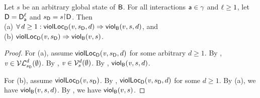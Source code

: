 \begin{proposition}
\label{prop:locScViol-implies-scViol}
\label{prop:lviol-implies-viol}
Let $s$ be an arbitrary global state of $\B$.
For all interactions $\act \in \gamma$ and $\l \ge 1$, let $\DS = \dsks{\act}{\l}$ and $\sD = s \pj \dsk{\act}{\l}$.
Then\\
\ind (a) $\fa d \ge 1:  \scVLd{\ndv}{d}{\sD}{\act}{\l} \imp \scVd{v}{d}{s} $, and\\
\ind (b) $\scVL{\ndv}{\sD}{\act}{\l} \imp \scV{v}{s}$.
\end{proposition}
%
\begin{proof}
For (a), assume $\scVLd{\ndv}{d}{\sD}{\act}{\l}$ for some arbitrary $d \ge 1$.
By ,  $\ndv \in \lVFsi{\sD}{\ewfg}{d}$.
By ,  $\ndv  \in \VFsi{s}{\ewfg}{d}$.
By , $\scVd{\ndv}{d}{s}$.

For (b), assume $\scVL{\ndv}{\sD}{\act}{\l}$. By ,
$\scVLd{\ndv}{d}{\sD}{\act}{\l}$ for some $d \ge 1$. By (a), we have $\scVd{v}{d}{s}$.
By , we have $\scV{v}{s}$.
\end{proof}
